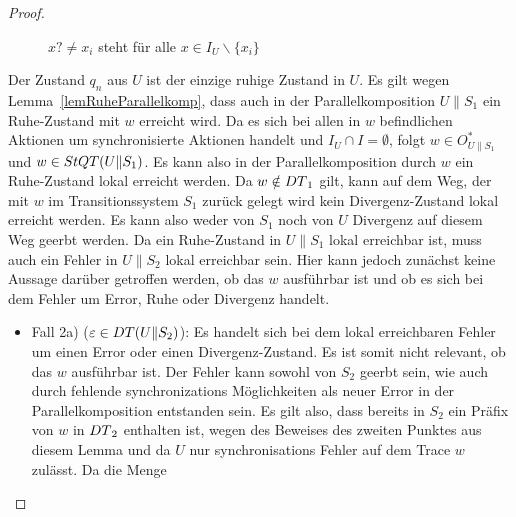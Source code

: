 \begin{proof}
\begin{itemize}
\begin{figure} [h!tbp]
\begin{center}
        \caption{$x?\neq x_i$ steht für alle $x\in I_U\backslash\{x_i\}$}
\label{UohneEmitIundO}
      \end{center}
      \end{figure}
      Der Zustand $q_n$ aus $U$ ist der einzige ruhige Zustand in $U$.
      Es gilt wegen Lemma~\ref{lemRuheParallelkomp}, dass auch in der
      Parallelkomposition $U\|S_1$ ein Ruhe-Zustand mit $w$ erreicht wird. Da
      es sich bei allen in $w$ befindlichen Aktionen um synchronisierte
      Aktionen handelt und $I_U\cap I=\emptyset$, folgt $w\in O_{U\|S_1}^*$ und
      $w\in StQT{}(U\|S_1)$. Es kann also in der Parallelkomposition durch $w$
      ein Ruhe-Zustand lokal erreicht werden. Da $w\notin DT{}_1$ gilt, kann
      auf dem Weg, der mit $w$ im Transitionssystem $S_1$ zurück gelegt wird
      kein Divergenz-Zustand lokal erreicht werden. Es kann also weder von
      $S_1$ noch von $U$ Divergenz auf diesem Weg geerbt werden. Da ein
      Ruhe-Zustand in $U\|S_1$ lokal erreichbar ist, muss auch ein Fehler in
      $U\|S_2$ lokal erreichbar sein. Hier kann jedoch zunächst keine Aussage
      darüber getroffen werden, ob das $w$ ausführbar ist und ob es sich bei
      dem Fehler um Error, Ruhe oder Divergenz handelt.
      \begin{itemize}
        \item Fall 2a) ($\varepsilon\in DT{}(U\|S_2)$): Es handelt sich bei
          dem lokal erreichbaren Fehler um einen Error oder einen
          Divergenz-Zustand. Es ist somit nicht relevant, ob das $w$ ausführbar
          ist. Der Fehler kann sowohl von $S_2$ geerbt sein, wie auch durch
          fehlende synchronizations Möglichkeiten als neuer Error in der
          Parallelkomposition entstanden sein. Es gilt also, dass bereits in
          $S_2$ ein Präfix von $w$ in $DT{}_2$ enthalten ist, wegen des
          Beweises des zweiten Punktes aus diesem Lemma und da $U$ nur
          synchronisations Fehler auf dem Trace $w$ zulässt. Da die Menge \DT{}

\end{itemize}
\end{itemize}
\end{proof}
